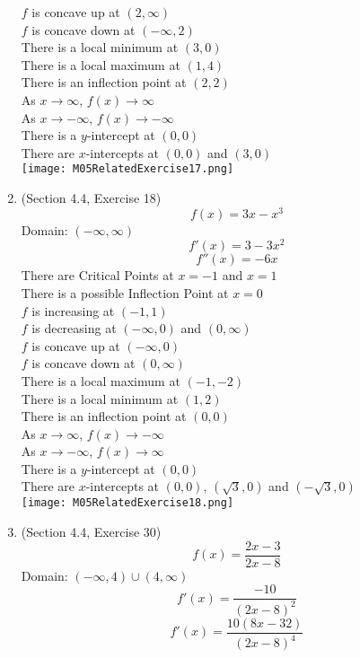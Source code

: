 \documentclass{article}
\begin{document}
\begin{enumerate}
        $f$ is concave up at $(2, \infty)$ \\
        $f$ is concave down at $(-\infty, 2)$ \\
        There is a local minimum at $(3, 0)$ \\
        There is a local maximum at $(1, 4)$ \\
        There is an inflection point at $(2, 2)$ \\
        As $x \to \infty$, $f(x) \to \infty$ \\
        As $x \to -\infty$, $f(x) \to -\infty$ \\
        There is a $y$-intercept at $(0, 0)$ \\
        There are $x$-intercepts at $(0, 0)$ and $(3, 0)$ \\
        \texttt{[image: M05RelatedExercise17.png]}
    \item (Section 4.4, Exercise 18)
        $$f(x) = 3x - x^3$$
        Domain: $(-\infty, \infty)$
        $$f'(x) = 3 - 3x^2$$
        $$f''(x) = - 6x$$
        There are Critical Points at $x = -1$ and $x = 1$ \\
        There is a possible Inflection Point at $x = 0$ \\
        $f$ is increasing at $(-1, 1)$ \\
        $f$ is decreasing at $(-\infty, 0)$ and $(0, \infty)$ \\
        $f$ is concave up at $(-\infty, 0)$ \\
        $f$ is concave down at $(0, \infty)$ \\
        There is a local maximum at $(-1, -2)$ \\
        There is a local minimum at $(1, 2)$ \\
        There is an inflection point at $(0, 0)$ \\
        As $x \to \infty$, $f(x) \to -\infty$ \\
        As $x \to -\infty$, $f(x) \to \infty$ \\
        There is a $y$-intercept at $(0, 0)$ \\
        There are $x$-intercepts at $(0, 0)$, $\left(\sqrt{3}, 0\right)$ and $\left(-\sqrt{3}, 0\right)$ \\
        \texttt{[image: M05RelatedExercise18.png]}
    \item (Section 4.4, Exercise 30)
        $$f(x) = \frac{2x - 3}{2x - 8}$$
        Domain: $(-\infty, 4)\cup(4, \infty)$
        $$f'(x) = \frac{-10}{\left(2x - 8\right)^2}$$
        $$f'(x) = \frac{10(8x - 32)}{\left(2x - 8\right)^4}$$

\end{enumerate}
\end{document}
